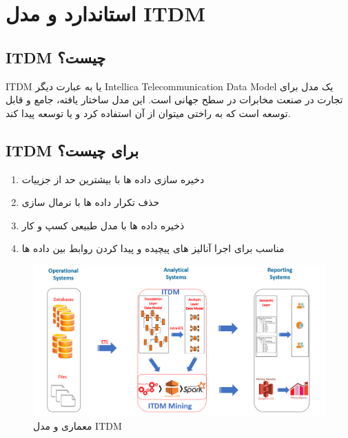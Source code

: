 \documentclass{llncs}
\begin{document}
\newpage

\section{استاندارد و مدل ITDM}
\subsection{ITDM چیست؟}
ITDM یا به عبارت دیگر Intellica Telecommunication Data Model یک مدل برای تجارت در صنعت مخابرات در سطح جهانی است. این مدل ساختار یافته، جامع و قابل توسعه است که به راختی میتوان از آن استفاده کرد و یا توسعه پیدا کند.

\subsection{ITDM برای چیست؟}
\begin{enumerate}
    \item دخیره سازی داده ها با بیشترین حد از جزییات
    \item حذف تکرار داده ها با نرمال سازی
    \item ذخیره داده ها با مدل طبیعی کسپ و کار
    \item مناسب برای اجرا آنالیز های پیچیده و پیدا کردن روابط بین داده ها
\end{enumerate}


\begin{figure}
\centering
\includegraphics[width=1\textwidth]{mahi/bi-4.png}
\centering
\caption{معماری و مدل ITDM}
\label{fig:ReportedVariables}
\end{figure}

\newpage
\end{document}
